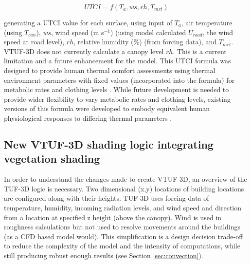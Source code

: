 \documentclass[final,3p,times,authoryear]{elsarticle}
\begin{document}
\begin{equation}\label{eq:utci}
  UTCI = f(T_{a}, ws, rh, T_{mrt})
\end{equation}

generating a UTCI value for each surface, using input of $T_{a}$, air temperature (using $T_{can}$), $ws$, wind speed (m s$^{-1}$) (using model calculated $U_{road}$, the wind speed at road level), $rh$, relative humidity (\%) (from forcing data), and $T_{mrt}$. VTUF-3D does not currently calculate a canopy level $rh$. This is a current limitation and a future enhancement for the model. This UTCI formula was designed to provide human thermal comfort assessments using thermal environment parameters with fixed values (incorporated into the formula) for metabolic rates and clothing levels \citep{Brode2012a}. While future development is needed to provide wider flexibility to vary metabolic rates and clothing levels, existing versions of this formula were developed to embody equivalent human physiological responses to differing thermal parameters \citep{Havenith2012,Fiala2012}.

\subsection{New VTUF-3D shading logic integrating vegetation shading}\label{sec:integration}
In order to understand the changes made to create VTUF-3D, an overview of the TUF-3D logic is necessary. Two dimensional (x,y) locations of building locations are configured along with their heights. TUF-3D uses forcing data of temperature, humidity, incoming radiation levels, and wind speed and direction from a location at specified z height (above the canopy). Wind is used in roughness calculations but not used to resolve movements around the buildings (as a CFD based model would). This simplification is a design decision trade-off to reduce the complexity of the model and the intensity of computations, while still producing robust enough results (see Section \ref{sec:convection}).
\end{document}
